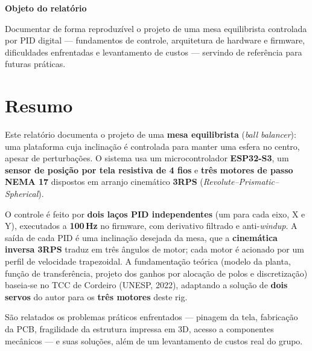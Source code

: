 \documentclass[11pt,a4paper,oneside]{article}
\begin{document}
\begin{titlepage}
\vfill

\begin{center}
\begin{tcolorbox}[enhanced,width=0.86\textwidth,colback=paperbg,
  colframe=primary,boxrule=1pt,arc=5pt,
  left=14pt,right=14pt,top=10pt,bottom=10pt]
  {\bfseries\color{primary}Objeto do relatório}\par\smallskip
  {\small Documentar de forma reproduzível o projeto de uma mesa equilibrista
  controlada por PID digital — fundamentos de controle, arquitetura de
  hardware e firmware, dificuldades enfrentadas e levantamento de custos —
  servindo de referência para futuras práticas.}
\end{tcolorbox}
\end{center}

\vspace{2.4cm}
\end{titlepage}

\section*{Resumo}

Este relatório documenta o projeto de uma \textbf{mesa equilibrista} (\emph{ball
balancer}): uma plataforma cuja inclinação é controlada para manter uma esfera
no centro, apesar de perturbações. O sistema usa um microcontrolador
\textbf{ESP32-S3}, um \textbf{sensor de posição por tela resistiva de 4 fios} e
\textbf{três motores de passo NEMA 17} dispostos em arranjo cinemático
\textbf{3RPS} (\emph{Revolute–Prismatic–Spherical}).

O controle é feito por \textbf{dois laços PID independentes} (um para cada eixo,
X e Y), executados a \textbf{100\,Hz} no firmware, com derivativo filtrado e
anti-\emph{windup}. A saída de cada PID é uma inclinação desejada da mesa, que a
\textbf{cinemática inversa 3RPS} traduz em três ângulos de motor; cada motor é
acionado por um perfil de velocidade trapezoidal. A fundamentação teórica
(modelo da planta, função de transferência, projeto dos ganhos por alocação de
polos e discretização) baseia-se no TCC de Cordeiro (UNESP, 2022), adaptando a
solução de \textbf{dois servos} do autor para os \textbf{três motores} deste rig.

São relatados os problemas práticos enfrentados — pinagem da tela, fabricação da
PCB, fragilidade da estrutura impressa em 3D, acesso a componentes mecânicos — e
suas soluções, além de um levantamento de custos real do grupo.
\end{document}

